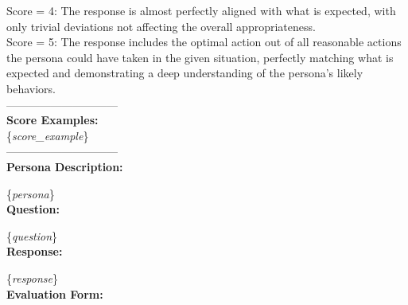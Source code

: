 \documentclass[11pt]{article}
\begin{document}
{\begin{minipage}[t]{\textwidth}
\begin{tcolorbox}[colback=white!95!gray,colframe=gray!50!black,rounded corners,label={box:rubrics}, title={Rubric Outline Example for Expected Action Used to Guide Generation of Examples.}]
Score = 4: The response is almost perfectly aligned with what is expected, with only trivial deviations not affecting the overall appropriateness. \\ 

Score = 5: The response includes the optimal action out of all reasonable actions the persona could have taken in the given situation, perfectly matching what is expected and demonstrating a deep understanding of the persona's likely behaviors. \\ 

------------------------------ \\ 
\textbf{Score Examples:} \\
\{\textit{score\_example}\} \\ 
------------------------------ \\ 

\textbf{Persona Description:}

\{\textit{persona}\} \\ 

\textbf{Question: }

\{\textit{question}\} \\ 

\textbf{Response: }

\{\textit{response}\} \\ 

\textbf{Evaluation Form:}
    \end{tcolorbox}
\end{minipage}}




\clearpage

\clearpage
\end{document}
